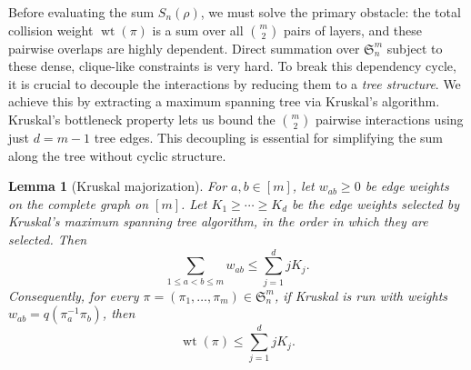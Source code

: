 \documentclass[10pt,a4paper]{amsart}
\newtheorem{lemma}[theorem]{Lemma}
\renewcommand\le{\leqslant}
\renewcommand\ge{\geqslant}
\newcommand{\wt}{\operatorname{wt}}
\begin{document}
Before evaluating the sum $S_n(\rho)$, we must solve the primary obstacle: the total collision weight $\wt(\pi)$ is a sum over all $\binom{m}{2}$ pairs of layers, and these pairwise overlaps are highly dependent. Direct summation over $\mathfrak{S}_n^m$ subject to these dense, clique-like constraints is very hard. To break this dependency cycle, it is crucial to decouple the interactions by reducing them to a \emph{tree structure}. We achieve this by extracting a maximum spanning tree via Kruskal's algorithm. Kruskal's bottleneck property lets us bound the $\binom{m}{2}$ pairwise interactions using just $d = m-1$ tree edges. This decoupling is essential for simplifying the sum along the tree without cyclic structure.



\begin{lemma}[Kruskal majorization]\label{lem:kruskal-majorization-detailed}
For $a,b\in[m]$, let $w_{ab}\ge0$ be edge weights on the complete graph on $[m]$. Let $K_1\ge\cdots\ge K_d$ be the edge weights selected by Kruskal's maximum spanning tree algorithm, in the order in which they are selected. Then
\begin{equation}\label{eq:kruskal-majorization-detailed}
        \sum_{1\le a<b\le m}w_{ab}\le \sum_{j=1}^d jK_j .
\end{equation}
Consequently, for every $\pi=(\pi_1,\ldots,\pi_m)\in\mathfrak S_n^m$, if Kruskal is run with weights $w_{ab}=q(\pi_a^{-1}\pi_b)$, then
\begin{equation}\label{eq:refined-tree-majorization}
        \wt(\pi)\le \sum_{j=1}^d jK_j .
\end{equation}
\end{lemma}
\end{document}
